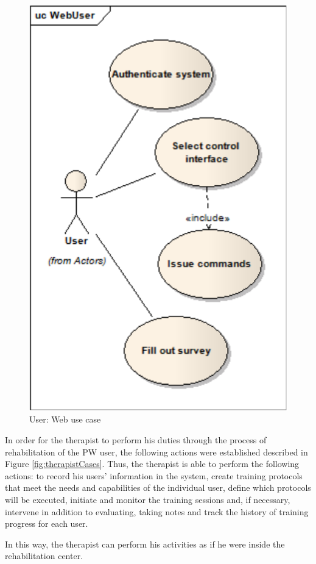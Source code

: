 \begin{figure}[!htbp]
\begin{minipage}{0.45\linewidth}
\includegraphics[width=0.75\linewidth]{img/cap4/userCaseWeb}
\caption{User: Web use case} \label{subfig:userCaseWeb}
\end{minipage}
\end{figure}

In order for the therapist to perform his duties through the process of rehabilitation of the PW user, the following actions were established described in Figure \ref{fig:therapistCases}. Thus, the therapist is able to perform the following actions: to record his users' information in the system, create training protocols that meet the needs and capabilities of the individual user, define which protocols will be executed, initiate and monitor the training sessions and, if necessary, intervene in addition to evaluating, taking notes and track the history of training progress for each user. 

In this way, the therapist can perform his activities as if he were inside the rehabilitation center.

